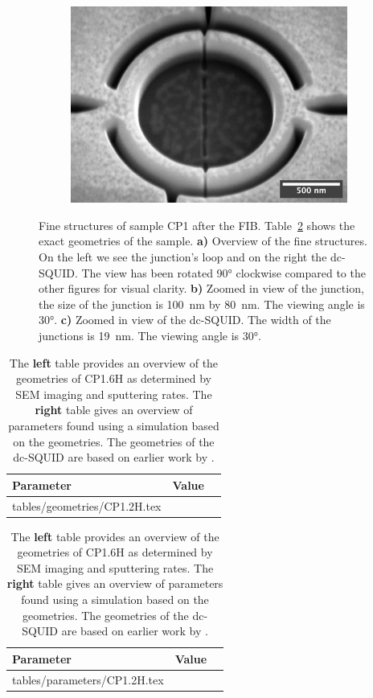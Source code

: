 \begin{figure}[ht!]
\begin{subfigure}[t]{0.3\textwidth}
		\includegraphics[width=\textwidth]{figures/samples/CP1/CP1.2H_SEM_SQUID.jpg}
	\end{subfigure}

	\caption{Fine structures of sample CP1 after the FIB. Table~\ref{tab:CP1.6H-geometries} shows the exact geometries of the sample. \textbf{a)} Overview of the fine structures. On the left we see the junction's loop and on the right the dc-SQUID. The view has been rotated \ang{90} clockwise compared to the other figures for visual clarity. \textbf{b)} Zoomed in view of the junction, the size of the junction is \qty{100}{\nano\meter} by \qty{80}{\nano\meter}. The viewing angle is \ang{30}. \textbf{c)} Zoomed in view of the dc-SQUID. The width of the junctions is \qty{19}{\nano\meter}. The viewing angle is \ang{30}.}
	\label{fig:CP1.2H-SEM-images}
\end{figure}

\begin{table}
	\begin{subtable}{.6\linewidth}
		\begin{tabular}[t]{@{}lrr@{}}
			\toprule
			Parameter & Value \\ \midrule
			\expandableinput tables/geometries/CP1.2H.tex
			\bottomrule
		\end{tabular}
    \end{subtable}
    \hfill
    \begin{subtable}{.3\linewidth}
    	\flushright
    	\begin{tabular}[t]{@{}lrr@{}}
    		\toprule
    		Parameter & Value \\ \midrule
    		\expandableinput tables/parameters/CP1.2H.tex
    		\bottomrule
    	\end{tabular}
    \end{subtable}
    \caption{The \textbf{left} table provides an overview of the geometries of CP1.6H as determined by SEM imaging and sputtering rates. The \textbf{right} table gives an overview of parameters found using a simulation based on the geometries. The geometries of the dc-SQUID are based on earlier work by \citeauthor{rogSQUIDontipMagneticMicroscopy2022} \citeyear{rogSQUIDontipMagneticMicroscopy2022}.}
    \label{tab:CP1.6H-geometries}
\end{table}